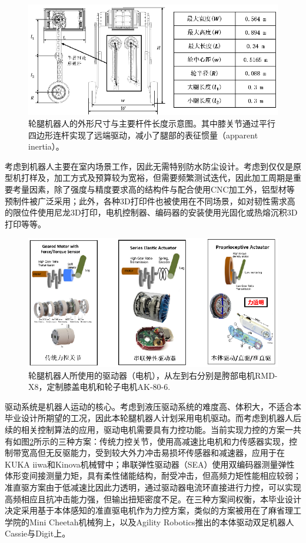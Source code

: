 \begin{figure}[h!]
  \centering
  \includegraphics[width=0.9\linewidth]{figures/Sec2/dim.png}
  \caption{
  轮腿机器人的外形尺寸与主要杆件长度示意图。其中膝关节通过平行四边形连杆实现了远端驱动\cite{spong2006robot}，减小了腿部的表征惯量（apparent inertia）。
  }
  \label{fig:sec2-dim}
   \vspace{6pt}
\end{figure}

考虑到机器人主要在室内场景工作，因此无需特别防水防尘设计。考虑到仅仅是原型机打样及，加工方式及预算较为宽裕，但需要频繁测试迭代，因此加工周期是重要考量因素，除了强度与精度要求高的结构件与配合使用CNC加工外，铝型材等预制件被广泛采用；此外，各种3D打印件也被使用在不同场景，如对韧性需求高的限位件使用尼龙3D打印，电机控制器、编码器的安装使用光固化或热熔沉积3D打印等等。

\begin{figure}
  \centering
  \includegraphics[width=0.7\linewidth]{figures/Sec2/force.png}
  \caption{
  轮腿机器人所使用的驱动器（电机），从左到右分别是胯部电机RMD-X8，定制膝盖电机和轮子电机AK-80-6.
  }
  \label{fig:sec2-force}
   \vspace{6pt}
\end{figure}

驱动系统是机器人运动的核心。考虑到液压驱动系统的难度高、体积大，不适合本毕业设计所期望的工况，因此本轮腿机器人计划采用电机驱动。而考虑到机器人后续的相关控制算法的应用，驱动电机需要具有力控功能。当前实现力控的方案一共有如图\ref{fig:sec2-force}所示的三种方案：传统力控关节，使用高减速比电机和力传感器实现，控制带宽高但无反驱能力，受到较大外力冲击易损坏传感器和减速器，应用于在KUKA iiwa\cite{bischoff2010kuka}和Kinova机械臂中；串联弹性驱动器（SEA）\cite{pratt1995series}使用双编码器测量弹性体形变间接测量力矩，具有柔性储能结构，耐受冲击，但高频力矩性能相应较弱；准直驱方案\cite{seok2012actuator}\cite{wensing2017proprioceptive}由于低减速比因此力透明，通过驱动器电流环直接进行力控，可以实现高频相应且抗冲击能力强，但输出扭矩密度不足。在三种方案间权衡，本毕业设计决定采用基于本体感知的准直驱电机作为力控方案，类似的方案被用在了麻省理工学院的Mini Cheetah机械狗\cite{katz2019mini}上，以及Agility Robotics推出的本体驱动双足机器人Cassie\cite{apgar2018fast-cassie}与Digit上。

